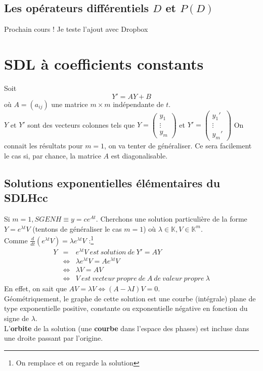 \documentclass[11pt, a4paper, openany]{book}
\begin{document}
\subsection{Les opérateurs différentiels $D$ et $P(D)$}
Prochain cours ! 
Je teste l'ajout avec Dropbox
\fi 
		
		
		
\setcounter{section}{2}
\section{SDL à coefficients constants}
Soit 
\begin{equation}
	Y' = AY + B
\end{equation}
où $A = (a_{ij})$ une matrice $m\times m$ indépendante de $t$.\\
$Y$ et $Y'$ sont des vecteurs colonnes tels que $Y = \left(\begin{array}{l}
y_1\\
\vdots\\
y_m
\end{array}\right)$ et $Y' = \left(\begin{array}{l}
y_1'\\
\vdots\\
y_m'
\end{array}\right)$
On connait les résultats pour $m=1$, on va tenter de généraliser. Ce sera facilement le cas si, par chance, la matrice $A$ est diagonalisable.
		
\subsection{Solutions exponentielles élémentaires du SDLHcc}
Si $m=1, SGENH \equiv y = ce^{At}$. Cherchons une solution particulière de la forme $Y = e^{\lambda t}V$ (tentons de généraliser le cas $m=1$) où $\lambda \in \mathbb{K}, V \in \mathbb{K}^m$.\\
Comme $\frac{d}{dt}(e^{\lambda t}V) = \lambda e^{\lambda t}V$ :\footnote{On remplace et on regarde la solution}
\begin{eqnarray}
	Y &=& e^{\lambda t}V\ est\ solution\ de\ Y'=AY\\
	&\Leftrightarrow & \lambda e^{\lambda t}V = Ae^{\lambda t}V\\
	&\Leftrightarrow & \lambda V = AV\\
	&\Leftrightarrow &V\ est\ vecteur\ propre\ de\ A\ de\ valeur\ propre\ \lambda
\end{eqnarray}
En effet, on sait que $AV = \lambda V \Leftrightarrow(A-\lambda I)V = 0$.\\
Géométriquement, le graphe de cette solution est une courbe (intégrale) plane de type exponentielle positive, constante ou exponentielle négative en fonction du signe de $\lambda$.\\
L'\textbf{orbite} de la solution (une \textbf{courbe} dans l'espace des phases) est incluse dans une droite passant par l'origine.
		
\end{document}
